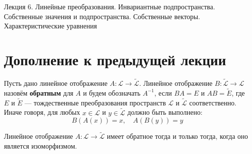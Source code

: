 \documentclass[11pt]{article}
\begin{document}
\begin{titlepage}
    \centering
    \vspace*{\fill}  %

    {\Huge Лекция 6. Линейные преобразования. Инвариантные подпространства. Собственные значения и подпространства. Собственные векторы. Характеристические уравнения
    \par}

    \vspace*{\fill}  %
\end{titlepage}

\setcounter{page}{1}

\section{Дополнение к предыдущей лекции}

\begin{definition}
    Пусть дано линейное отображение $A \colon \mathcal{L} \to \widetilde{\mathcal{L}}$. Линейное отображение $B \colon \widetilde{\mathcal{L}} \to \mathcal{L}$ назовём \textbf{обратным} для $A$ и будем обозначать 
    $A^{-1}$, если $BA = E$ и $AB = \widetilde{E}$, где $E$ и $\widetilde{E}$ --- тождественные преобразования пространств $\mathcal{L}$ и $\widetilde{\mathcal{L}}$ соответственно. Иначе говоря, для любых $x \in \mathcal{L}$ и $y \in \widetilde{\mathcal{L}}$ должно быть выполнено:
    \[B(A(x)) = x, \quad A(B(y)) = y\]
\end{definition}

\begin{theorem}
    Линейное отображение $A \colon \mathcal{L} \to \widetilde{\mathcal{L}}$ имеет обратное 
    тогда и только тогда, когда оно является изоморфизмом.
\end{theorem}
\end{document}
